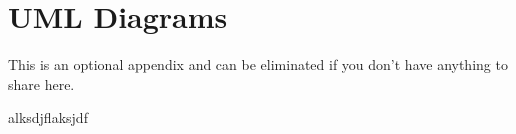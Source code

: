 \chapter{UML Diagrams}

This is an optional appendix and can be eliminated if you don't have anything 
to share here.

alksdjflaksjdf